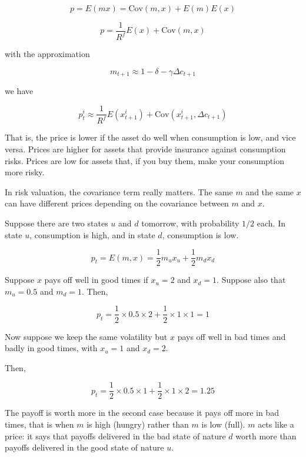 \begin{equation}
    p = E(mx) = \text{Cov}(m, x) + E(m)E(x)
\end{equation}

\begin{equation}
    p = \frac{1}{R^f} E(x) + \text{Cov}(m, x)
\end{equation}

with the approximation

\begin{equation}
    m_{t+1} \approx 1 - \delta - \gamma \Delta c_{t+1}
\end{equation}

we have

\begin{equation}
p^i_t \approx \frac{1}{R^f} E(x^i_{t+1}) + \text{Cov}(x^i_{t+1}, \Delta c_{t+1})
\end{equation}

That is, the price is lower if the asset do well 
when consumption is low, and vice versa. Prices are higher 
for assets that provide insurance against consumption risks.
Prices are low for assets that, if you buy them, make your consumption
more risky. 

In risk valuation, the covariance term really matters. 
The same $m$ and the same $x$ can have different prices depending on the covariance between
$m$ and $x$. 

\begin{tcolorbox}[colback=white, colframe=black, title=Example 1]
Suppose there are two states $u$ and $d$ tomorrow, with probability
$1/2$ each. In state $u$, consumption is high, and in state $d$,
consumption is low.

\begin{equation}
    p_t = E(m, x) = \frac{1}{2} m_u x_u + \frac{1}{2} m_d x_d
\end{equation}


Suppose $x$ pays off well in good times if $x_u = 2$ and 
$x_d = 1$. Suppose also that $m_u = 0.5$ and $m_d = 1$. 
Then,

\begin{equation}
    p_t = \frac{1}{2} \times 0.5 \times 2 + \frac{1}{2} \times 1 \times 1 = 1
\end{equation}

Now suppose we keep the same volatility but $x$ pays off well 
in bad times and badly in good times, with $x_u = 1$ and $x_d = 2$.

Then,

\begin{equation}
    p_t = \frac{1}{2} \times 0.5 \times 1 + \frac{1}{2} \times 1 \times 2 = 1.25
\end{equation}

The payoff is worth more in the second case because it pays off
more in bad times, that is when $m$ is high (hungry) rather 
than $m$ is low (full). 
$m$ acts like a price: it says that payoffs 
delivered in the bad state of nature $d$ worth more than 
payoffs delivered in the good state of nature $u$.

\end{tcolorbox}

